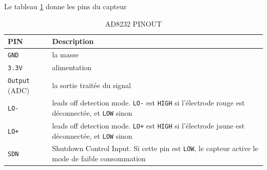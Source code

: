 Le tableau \ref{table:AD8232PINOUT} donne les pins du capteur
\begin{table}[H]
  \centering\small
  \begin{tabular}{lp{}}
  \toprule
  {\bf PIN}&{\bf Description}\\
  \toprule
  \texttt{GND}&la masse\\
  \midrule
  \texttt{3.3V}&alimentation\\
  \midrule
  \texttt{Output} (ADC)&la sortie traitée du signal\\
  \midrule
  \texttt{LO-}&leads off detection mode. \texttt{LO-} est \texttt{HIGH} si l'électrode rouge est déconnectée, et \texttt{LOW} sinon\\
  \midrule
  \texttt{LO+}&leads off detection mode. \texttt{LO+} est \texttt{HIGH} si l'électrode jaune est déconnectée, et \texttt{LOW} sinon\\
  \midrule
  \texttt{SDN}&Shutdown Control Input. Si cette pin est \texttt{LOW}, le capteur active le mode de faible consommation\\
  \bottomrule
  \end{tabular}
  \caption{AD8232 PINOUT}
  \label{table:AD8232PINOUT}
\end{table}
